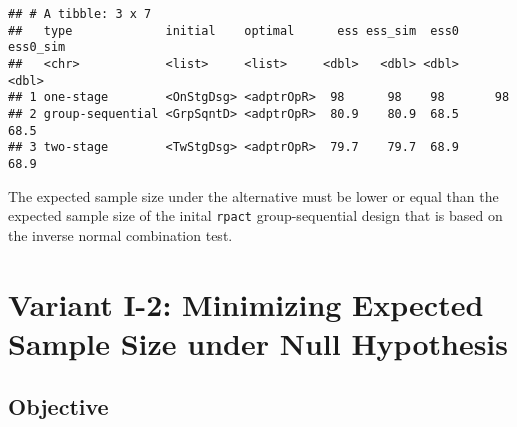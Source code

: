 \documentclass[]{book}
\newenvironment{Shaded}{\begin{snugshade}}{\end{snugshade}}
\newcommand{\DecValTok}[1]{\textcolor[rgb]{0.00,0.00,0.81}{#1}}
\newcommand{\KeywordTok}[1]{\textcolor[rgb]{0.13,0.29,0.53}{\textbf{#1}}}
\newcommand{\NormalTok}[1]{#1}
\newcommand{\OperatorTok}[1]{\textcolor[rgb]{0.81,0.36,0.00}{\textbf{#1}}}
\newcommand{\StringTok}[1]{\textcolor[rgb]{0.31,0.60,0.02}{#1}}
\begin{document}
\begin{verbatim}
## # A tibble: 3 x 7
##   type             initial    optimal      ess ess_sim  ess0 ess0_sim
##   <chr>            <list>     <list>     <dbl>   <dbl> <dbl>    <dbl>
## 1 one-stage        <OnStgDsg> <adptrOpR>  98      98    98       98  
## 2 group-sequential <GrpSqntD> <adptrOpR>  80.9    80.9  68.5     68.5
## 3 two-stage        <TwStgDsg> <adptrOpR>  79.7    79.7  68.9     68.9
\end{verbatim}

The expected sample size under the alternative must be lower or equal than
the expected sample size of the inital \texttt{rpact} group-sequential design that
is based on the inverse normal combination test.

\begin{Shaded}
\end{Shaded}

\hypertarget{variantI_2}{%
\section{Variant I-2: Minimizing Expected Sample Size under Null Hypothesis}\label{variantI_2}}

\hypertarget{objective-1}{%
\subsection{Objective}\label{objective-1}}
\end{document}

